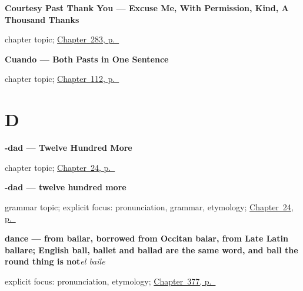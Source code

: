 \noindent\begin{minipage}[t]{\linewidth}
\raggedright
\textbf{Courtesy Past Thank You --- Excuse Me, With Permission, Kind, A Thousand Thanks}\par
\footnotesize chapter topic; \hyperref[ch:cortesia]{Chapter~283, p.~\pageref*{ch:cortesia}}
\end{minipage}\par\smallskip

\noindent\begin{minipage}[t]{\linewidth}
\raggedright
\textbf{Cuando --- Both Pasts in One Sentence}\par
\footnotesize chapter topic; \hyperref[ch:cuando]{Chapter~112, p.~\pageref*{ch:cuando}}
\end{minipage}\par\smallskip

\section*{D}

\noindent\begin{minipage}[t]{\linewidth}
\raggedright
\textbf{-dad --- Twelve Hundred More}\par
\footnotesize chapter topic; \hyperref[ch:friend-dad]{Chapter~24, p.~\pageref*{ch:friend-dad}}
\end{minipage}\par\smallskip

\noindent\begin{minipage}[t]{\linewidth}
\raggedright
\textbf{-dad — twelve hundred more}\par
\footnotesize grammar topic; explicit focus: pronunciation, grammar, etymology; \hyperref[ch:friend-dad]{Chapter~24, p.~\pageref*{ch:friend-dad}}
\end{minipage}\par\smallskip

\noindent\begin{minipage}[t]{\linewidth}
\raggedright
\textbf{dance — from bailar, borrowed from Occitan balar, from Late Latin ballare; English ball, ballet and ballad are the same word, and ball the round thing is not}\enspace\emph{el baile}\par
\footnotesize explicit focus: pronunciation, etymology; \hyperref[ch:la-letra-y-la-frase]{Chapter~377, p.~\pageref*{ch:la-letra-y-la-frase}}
\end{minipage}\par\smallskip

